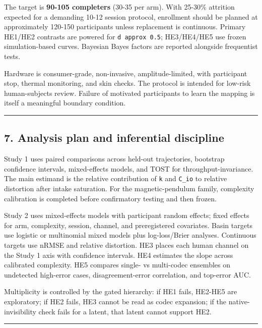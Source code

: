 \documentclass[
  11pt,
]{article}
\begin{document}
The target is \textbf{90-105 completers} (30-35
per arm). With 25-30\% attrition expected for a
demanding 10-12 session protocol, enrollment
should be planned at approximately 120-150
participants unless replacement is continuous.
Primary HE1/HE2 contrasts are powered for
\texttt{d\ approx\ 0.5}; HE3/HE4/HE5 use frozen
simulation-based curves. Bayesian Bayes factors
are reported alongside frequentist tests.

Hardware is consumer-grade, non-invasive,
amplitude-limited, with participant stop,
thermal monitoring, and skin checks. The
protocol is intended for low-risk human-subjects
review. Failure of motivated participants to
learn the mapping is itself a meaningful
boundary condition.

\begin{center}\rule{0.5\linewidth}{0.5pt}\end{center}

\subsection{7. Analysis plan and inferential
discipline}\label{analysis-plan-and-inferential-discipline}

Study 1 uses paired comparisons across held-out
trajectories, bootstrap confidence intervals,
mixed-effects models, and TOST for
throughput-invariance. The main estimand is the
relative contribution of \texttt{k} and
\texttt{C\_io} to relative distortion after
intake saturation. For the magnetic-pendulum
family, complexity calibration is completed
before confirmatory testing and then frozen.

Study 2 uses mixed-effects models with
participant random effects; fixed effects for
arm, complexity, session, channel, and
preregistered covariates. Basin targets use
logistic or multinomial mixed models plus
log-loss/Brier analyses. Continuous targets use
nRMSE and relative distortion. HE3 places each
human channel on the Study 1 axis with
confidence intervals. HE4 estimates the slope
across calibrated complexity. HE5 compares
single- vs multi-codec ensembles on undetected
high-error cases, disagreement-error
correlation, and top-error AUC.

Multiplicity is controlled by the gated
hierarchy: if HE1 fails, HE2-HE5 are
exploratory; if HE2 fails, HE3 cannot be read as
codec expansion; if the native-invisibility
check fails for a latent, that latent cannot
support HE2.

\begin{center}\rule{0.5\linewidth}{0.5pt}\end{center}
\end{document}
